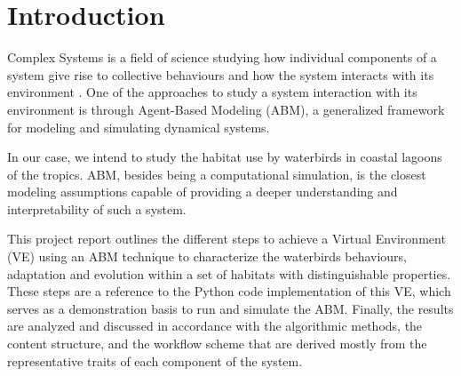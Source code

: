 %
%
%
%


\section{Introduction}
Complex Systems is a field of science studying how individual components of a system give rise to collective behaviours and how the system interacts with its environment \cite{ago2019abm}. One of the approaches to study a system interaction with its environment is through Agent-Based Modeling (ABM), a generalized framework for modeling and simulating dynamical systems.

In our case, we intend to study the habitat use by waterbirds in coastal lagoons of the tropics. ABM, besides being a computational simulation, is the closest modeling assumptions capable of providing a deeper understanding and interpretability of such a system.

This project report outlines the different steps to achieve a Virtual Environment (VE) using an ABM technique to characterize the waterbirds behaviours, adaptation and evolution within a set of habitats with distinguishable properties. These steps are a reference to the Python code implementation of this VE, which serves as a demonstration basis to run and simulate the ABM. Finally, the results are analyzed and discussed in accordance with the algorithmic methods, the content structure, and the workflow scheme that are derived mostly from the representative traits of each component of the system.

